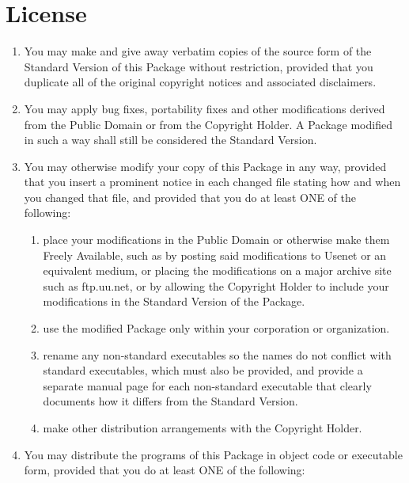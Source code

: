 \section*{License}
\label{sec:license}


\newcommand{\savelabelenumii}{\labelenumii}
\renewcommand{\labelenumii}{\alph{enumii})}


\begin{enumerate}
\item You may make and give away verbatim copies of the source form of
  the Standard Version of this Package without restriction, provided
  that you duplicate all of the original copyright notices and
  associated disclaimers.
\item You may apply bug fixes, portability fixes and other
  modifications derived from the Public Domain or from the Copyright
  Holder. A Package modified in such a way shall still be considered
  the Standard Version.
\item You may otherwise modify your copy of this Package in any way,
  provided that you insert a prominent notice in each changed file
  stating how and when you changed that file, and provided that you do
  at least ONE of the following:
   \begin{enumerate}
   \item place your modifications in the Public Domain or otherwise
     make them Freely Available, such as by posting said modifications
     to Usenet or an equivalent medium, or placing the modifications
     on a major archive site such as ftp.uu.net, or by allowing the
     Copyright Holder to include your modifications in the Standard
     Version of the Package.
   \item use the modified Package only within your corporation or
     organization.
   \item rename any non-standard executables so the names do not
     conflict with standard executables, which must also be provided,
     and provide a separate manual page for each non-standard
     executable that clearly documents how it differs from the
     Standard Version.
   \item make other distribution arrangements with the Copyright
     Holder.
\end{enumerate}

\item You may distribute the programs of this Package in object code
  or executable form, provided that you do at least ONE of the
  following:
   

\end{enumerate}
